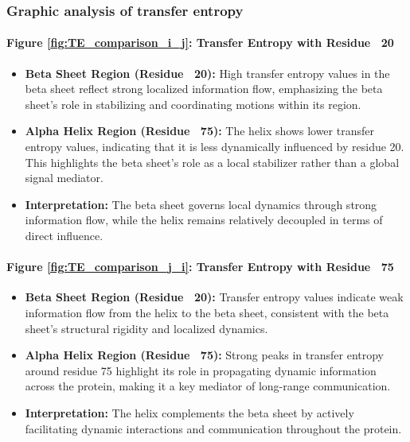 \documentclass[English, Lau, oneside]{sapthesis}
\begin{document}
\subsubsection{Graphic analysis of transfer entropy}
\paragraph{Figure \ref{fig:TE_comparison_i_j}: Transfer Entropy with Residue ~20}
\begin{itemize}
    \item \textbf{Beta Sheet Region (Residue ~20):} High transfer entropy values in the beta sheet reflect strong localized information flow, emphasizing the beta sheet's role in stabilizing and coordinating motions within its region.
    \item \textbf{Alpha Helix Region (Residue ~75):} The helix shows lower transfer entropy values, indicating that it is less dynamically influenced by residue 20. This highlights the beta sheet's role as a local stabilizer rather than a global signal mediator.
    \item \textbf{Interpretation:} The beta sheet governs local dynamics through strong information flow, while the helix remains relatively decoupled in terms of direct influence.
\end{itemize}

\paragraph{Figure \ref{fig:TE_comparison_j_i}: Transfer Entropy with Residue ~75}
\begin{itemize}
    \item \textbf{Beta Sheet Region (Residue ~20):} Transfer entropy values indicate weak information flow from the helix to the beta sheet, consistent with the beta sheet's structural rigidity and localized dynamics.
    \item \textbf{Alpha Helix Region (Residue ~75):} Strong peaks in transfer entropy around residue 75 highlight its role in propagating dynamic information across the protein, making it a key mediator of long-range communication.
    \item \textbf{Interpretation:} The helix complements the beta sheet by actively facilitating dynamic interactions and communication throughout the protein.
\end{itemize}
\end{document}
